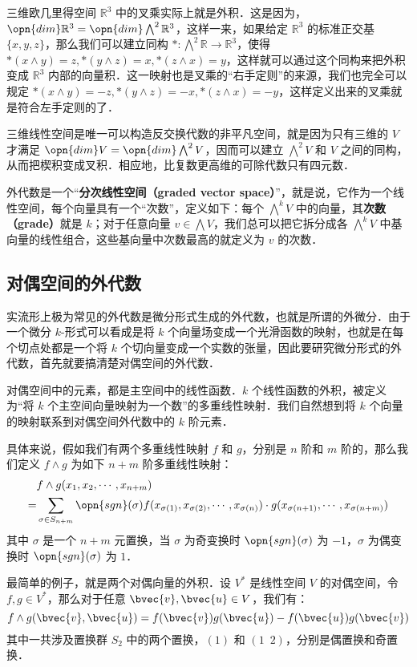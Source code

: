三维欧几里得空间 $\mathbb{R}^3$ 中的叉乘实际上就是外积．这是因为，$\opn{dim}\mathbb{R}^3=\opn{dim}\bigwedge^2\mathbb{R}^3$，这样一来，如果给定 $\mathbb{R}^3$ 的标准正交基 $\{x, y, z\}$，那么我们可以建立同构 $*: \bigwedge^2\mathbb{R}\rightarrow\mathbb{R}^3$，使得 $*(x\wedge y)=z, *(y\wedge z)=x, *(z\wedge x)=y$，这样就可以通过这个同构来把外积变成 $\mathbb{R}^3$ 内部的向量积．这一映射也是叉乘的“右手定则”的来源，我们也完全可以规定 $*(x\wedge y)=-z, *(y\wedge z)=-x, *(z\wedge x)=-y$，这样定义出来的叉乘就是符合左手定则的了．

三维线性空间是唯一可以构造反交换代数的非平凡空间，就是因为只有三维的 $V$ 才满足 $\opn{dim}V=\opn{dim}\bigwedge^2V$，因而可以建立 $\bigwedge^2 V$ 和 $V$ 之间的同构，从而把楔积变成叉积．相应地，比复数更高维的可除代数只有四元数．

外代数是一个“\textbf{分次线性空间（graded vector space）}”，就是说，它作为一个线性空间，每个向量具有一个“次数”，定义如下：每个 $\bigwedge^kV$ 中的向量，其\textbf{次数（grade）}就是 $k$；对于任意向量 $v\in \bigwedge V$，我们总可以把它拆分成各 $\bigwedge^kV$ 中基向量的线性组合，这些基向量中次数最高的就定义为 $v$ 的次数．


\subsection{对偶空间的外代数}

实流形上极为常见的外代数是微分形式生成的外代数，也就是所谓的外微分．由于一个微分 $k$-形式可以看成是将 $k$ 个向量场变成一个光滑函数的映射，也就是在每个切点处都是一个将 $k$ 个切向量变成一个实数的张量，因此要研究微分形式的外代数，首先就要搞清楚对偶空间的外代数．

对偶空间中的元素，都是主空间中的线性函数．$k$ 个线性函数的外积，被定义为“将 $k$ 个主空间向量映射为一个数”的多重线性映射．我们自然想到将 $k$ 个向量的映射联系到对偶空间外代数中的 $k$ 阶元素．

具体来说，假如我们有两个多重线性映射 $f$ 和 $g$，分别是 $n$ 阶和 $m$ 阶的，那么我们定义 $f\wedge g$ 为如下 $n+m$ 阶多重线性映射：
\begin{equation}
\begin{aligned}
&f\wedge g(x_1, x_2, \cdots, x_{n+m})\\=
&\sum\limits_{\sigma\in S_{n+m}}\opn{sgn}(\sigma) f(x_{\sigma(1)}, x_{\sigma(2)}, \cdots, x_{\sigma(n)})\cdot g(x_{\sigma(n+1)}, \cdots, x_{\sigma(n+m)})
\end{aligned}
\end{equation}
其中 $\sigma$ 是一个 $n+m$ 元置换，当 $\sigma$ 为奇变换时 $\opn{sgn}(\sigma)$ 为 $-1$，$\sigma$ 为偶变换时 $\opn{sgn}(\sigma)$ 为 $1$．

最简单的例子，就是两个对偶向量的外积．设 $V^*$ 是线性空间 $V$ 的对偶空间，令 $f, g\in V^*$，那么对于任意 $\bvec{v}, \bvec{u}\in V$，我们有：
\begin{equation}
f\wedge g(\bvec{v}, \bvec{u})=f(\bvec{v})g(\bvec{u})-f(\bvec{u})g(\bvec{v})
\end{equation}
其中一共涉及置换群 $S_2$ 中的两个置换，$(1)$ 和 $(1\phantom{2}2)$，分别是偶置换和奇置换．
